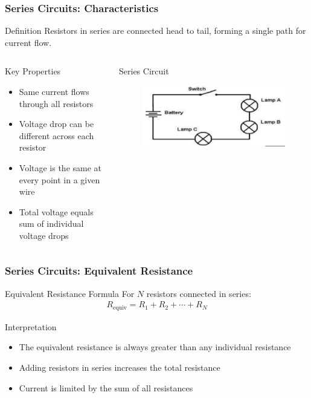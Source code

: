 \documentclass{beamer}
\begin{document}
\begin{frame}
\frametitle{Series Circuits: Characteristics}
\begin{block}{Definition}
Resistors in series are connected head to tail, forming a single path for current flow.
\end{block}

\begin{columns}
\begin{block}{Key Properties}
\begin{itemize}
\item Same current flows through all resistors
\item Voltage drop can be different across each resistor
\item Voltage is the same at every point in a given wire
\item Total voltage equals sum of individual voltage drops
\end{itemize}
\end{block}

\begin{alertblock}{Series Circuit}
\alert{}
\begin{figure}
    \centering
    \includegraphics[width=1\linewidth]{srecrc.png}
\end{figure}
\end{alertblock}
\end{columns}
\end{frame}

\begin{frame}
\frametitle{Series Circuits: Equivalent Resistance}
\begin{block}{Equivalent Resistance Formula}
For $N$ resistors connected in series:
\begin{align}
R_{\text{equiv}} = R_1 + R_2 + \cdots + R_N
\end{align}
\end{block}

\begin{block}{Interpretation}
\begin{itemize}
\item The equivalent resistance is always greater than any individual resistance
\item Adding resistors in series increases the total resistance
\item Current is limited by the sum of all resistances
\end{itemize}
\end{block}


\end{frame}
\end{document}
